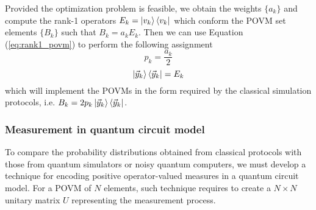 Provided the optimization problem is feasible, we obtain the weights $\{a_k\}$ and compute the rank-1 operators $E_k = \ket{v_k}\bra{v_k}$ which conform the POVM set elements $\{B_k\}$ such that $B_k=a_k E_k$. Then we can use Equation (\ref{eq:rank1_povm}) to perform the following assignment
\begin{equation}
    p_k = \frac{a_k}{2}
\end{equation}
\begin{equation}
    \ket{\vec{y}_k}\bra{\vec{y}_k} = E_k
\end{equation}
which will implement the POVMs in the form required by the classical simulation protocols, i.e. $B_{k} = 2p_{k}\ket{\vec{y}_{k}}\bra{\vec{y}_{k}}$.

\subsubsection{Measurement in quantum circuit model}\label{section:neumark}
To compare the probability distributions obtained from classical protocols with those from quantum simulators or noisy quantum computers, we must develop a technique for encoding positive operator-valued measures in a quantum circuit model. For a POVM of $N$ elements, such technique requires to create a $N\times N$ unitary matrix $U$ representing the measurement process.

